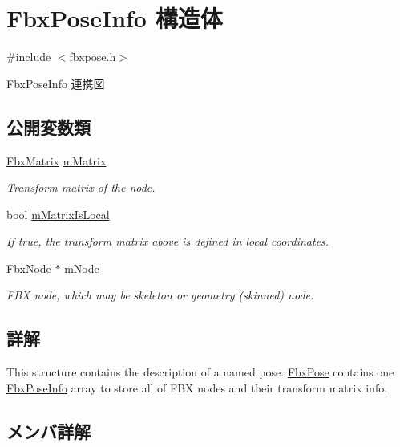 \hypertarget{struct_fbx_pose_info}{}\section{Fbx\+Pose\+Info 構造体}
\label{struct_fbx_pose_info}


{\ttfamily \#include $<$fbxpose.\+h$>$}



Fbx\+Pose\+Info 連携図
\subsection*{公開変数類}
\begin{DoxyCompactItemize}
\item 
\hyperlink{class_fbx_matrix}{Fbx\+Matrix} \hyperlink{struct_fbx_pose_info_aca02d941e426a2f6abbce9902ae92d73}{m\+Matrix}
\begin{DoxyCompactList}\small\item\em Transform matrix of the node. \end{DoxyCompactList}\item 
bool \hyperlink{struct_fbx_pose_info_a8da52035b7e08cafc70aa419111c7142}{m\+Matrix\+Is\+Local}
\begin{DoxyCompactList}\small\item\em If true, the transform matrix above is defined in local coordinates. \end{DoxyCompactList}\item 
\hyperlink{class_fbx_node}{Fbx\+Node} $\ast$ \hyperlink{struct_fbx_pose_info_a06e5aa4a4b65795d0a0bd87e4c79c74c}{m\+Node}
\begin{DoxyCompactList}\small\item\em F\+BX node, which may be skeleton or geometry (skinned) node. \end{DoxyCompactList}\end{DoxyCompactItemize}


\subsection{詳解}
This structure contains the description of a named pose. \hyperlink{class_fbx_pose}{Fbx\+Pose} contains one \hyperlink{struct_fbx_pose_info}{Fbx\+Pose\+Info} array to store all of F\+BX nodes and their transform matrix info. 

\subsection{メンバ詳解}
\mbox{\label{struct_fbx_pose_info_aca02d941e426a2f6abbce9902ae92d73}} 

